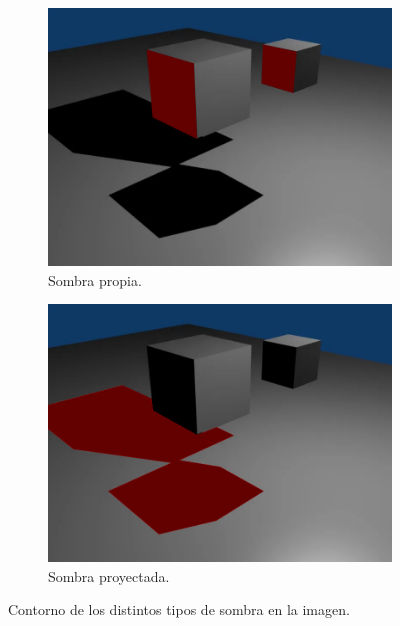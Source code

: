 \documentclass{article}
\begin{document}
\begin{figure}[H]
    \centering 
	\begin{subfigure}[H]{0.48\textwidth}
	    \centering
        \includegraphics[width=\textwidth]{imagenes/sombra0004propia.jpg}
        \caption{Sombra propia.}
    \end{subfigure}
    \hfill
	\begin{subfigure}[H]{0.48\textwidth}
	    \centering
        \includegraphics[width=\textwidth]{imagenes/sombra0004proy.jpg}
        \caption{Sombra proyectada.}
    \end{subfigure}    
    \caption{Contorno de los distintos tipos de sombra en la imagen.}
\end{figure}
\end{document}
